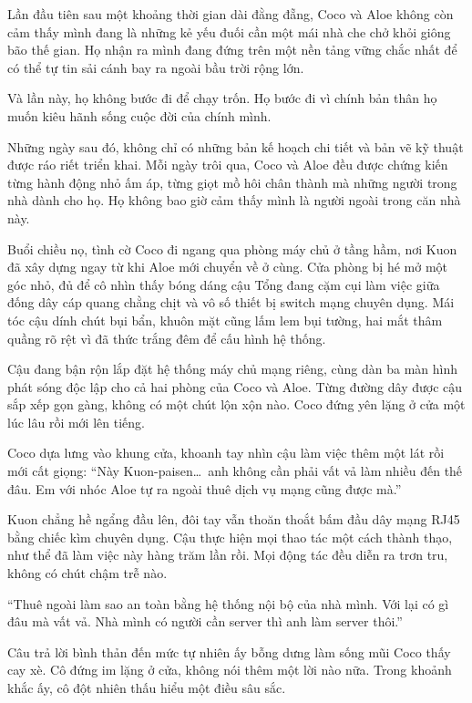 ﻿\documentclass[../main.tex]{subfiles}
\begin{document}
Lần đầu tiên sau một khoảng thời gian dài đằng đẵng, Coco và Aloe không còn cảm thấy mình đang là những kẻ yếu đuối cần một mái nhà che chở khỏi giông bão thế gian. Họ nhận ra mình đang đứng trên một nền tảng vững chắc nhất để có thể tự tin sải cánh bay ra ngoài bầu trời rộng lớn.

Và lần này, họ không bước đi để chạy trốn. Họ bước đi vì chính bản thân họ muốn kiêu hãnh sống cuộc đời của chính mình.

\ct

Những ngày sau đó, không chỉ có những bản kế hoạch chi tiết và bản vẽ kỹ thuật được ráo riết triển khai. Mỗi ngày trôi qua, Coco và Aloe đều được chứng kiến từng hành động nhỏ ấm áp, từng giọt mồ hôi chân thành mà những người trong nhà dành cho họ. Họ không bao giờ cảm thấy mình là người ngoài trong căn nhà này.

Buổi chiều nọ, tình cờ Coco đi ngang qua phòng máy chủ ở tầng hầm, nơi Kuon đã xây dựng ngay từ khi Aloe mới chuyển về ở cùng. Cửa phòng bị hé mở một góc nhỏ, đủ để cô nhìn thấy bóng dáng cậu Tổng đang cặm cụi làm việc giữa đống dây cáp quang chằng chịt và vô số thiết bị switch mạng chuyên dụng. Mái tóc cậu dính chút bụi bẩn, khuôn mặt cũng lấm lem bụi tường, hai mắt thâm quầng rõ rệt vì đã thức trắng đêm để cấu hình hệ thống.

Cậu đang bận rộn lắp đặt hệ thống máy chủ mạng riêng, cùng dàn ba màn hình phát sóng độc lập cho cả hai phòng của Coco và Aloe. Từng đường dây được cậu sắp xếp gọn gàng, không có một chút lộn xộn nào. Coco đứng yên lặng ở cửa một lúc lâu rồi mới lên tiếng.

Coco dựa lưng vào khung cửa, khoanh tay nhìn cậu làm việc thêm một lát rồi mới cất giọng: ``Này Kuon-paisen\dots\ anh không cần phải vất vả làm nhiều đến thế đâu. Em với nhóc Aloe tự ra ngoài thuê dịch vụ mạng cũng được mà.''

Kuon chẳng hề ngẩng đầu lên, đôi tay vẫn thoăn thoắt bấm đầu dây mạng RJ45 bằng chiếc kìm chuyên dụng. Cậu thực hiện mọi thao tác một cách thành thạo, như thể đã làm việc này hàng trăm lần rồi. Mọi động tác đều diễn ra trơn tru, không có chút chậm trễ nào.

``Thuê ngoài làm sao an toàn bằng hệ thống nội bộ của nhà mình. Với lại có gì đâu mà vất vả. Nhà mình có người cần server thì anh làm server thôi.''

Câu trả lời bình thản đến mức tự nhiên ấy bỗng dưng làm sống mũi Coco thấy cay xè. Cô đứng im lặng ở cửa, không nói thêm một lời nào nữa. Trong khoảnh khắc ấy, cô đột nhiên thấu hiểu một điều sâu sắc.
\end{document}
